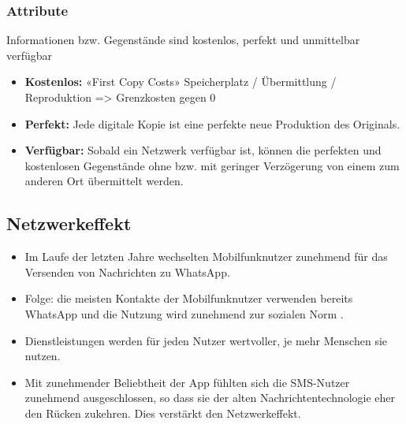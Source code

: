 \subsubsection{Attribute}
Informationen bzw. Gegenstände sind kostenlos, perfekt und unmittelbar verfügbar
\begin{itemize}
	\item \textbf{Kostenlos:} «First Copy Costs» Speicherplatz / Übermittlung / Reproduktion => Grenzkosten gegen 0
	\item \textbf{Perfekt:} Jede digitale Kopie ist eine perfekte neue Produktion des Originals.
	\item \textbf{Verfügbar:} Sobald ein Netzwerk verfügbar ist, können die perfekten und kostenlosen Gegenstände ohne bzw. mit geringer Verzögerung von einem zum anderen Ort übermittelt werden.
\end{itemize}

\subsection{Netzwerkeffekt}
\begin{itemize}
	\item Im Laufe der letzten Jahre wechselten Mobilfunknutzer zunehmend für das Versenden von Nachrichten zu WhatsApp.
	\item Folge: die meisten Kontakte der Mobilfunknutzer verwenden bereits WhatsApp und die Nutzung wird zunehmend zur sozialen Norm .
	\item Dienstleistungen werden für jeden Nutzer wertvoller, je mehr Menschen sie nutzen.
	\item Mit zunehmender Beliebtheit der App fühlten sich die SMS-Nutzer zunehmend ausgeschlossen, so dass sie der alten Nachrichtentechnologie eher den Rücken zukehren. Dies verstärkt den Netzwerkeffekt.
\end{itemize}

